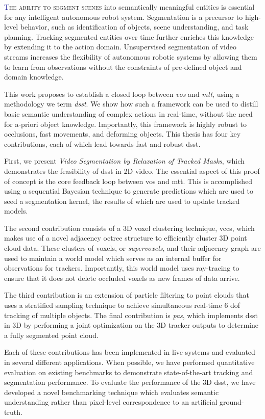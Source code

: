 \lettrine[lines=2, loversize=0.3]{\textcolor{DarkBlue}T}{he ability to segment scenes} into semantically meaningful entities is essential for any intelligent autonomous robot system. Segmentation is a precursor to high-level behavior, such as identification of objects, scene understanding, and task planning. Tracking segmented entities over time further enriches this knowledge by extending it to the action domain. Unsupervised segmentation of video streams increases the flexibility of autonomous robotic systems by allowing them to learn from observations without the constraints of pre-defined object and domain knowledge.

This work proposes to establish a closed loop between \emph{\gls{vos}} and \emph{\gls{mtt}}, using a methodology we term \emph{\gls{dsst}}. We show how such a framework can be used to distill basic semantic understanding of complex actions in real-time, without the need for a-priori object knowledge. Importantly, this framework is highly robust to occlusions, fast movements, and deforming objects. This thesis has four key contributions, each of which lead towards fast and robust \gls{dsst}.

First, we present \emph{Video Segmentation by Relaxation of Tracked Masks}, which demonstrates the feasibility of \gls{dsst} in 2D video. The essential aspect of this proof of concept is the core feedback loop between \gls{vos} and \gls{mtt}. This is accomplished using a sequential Bayesian technique to generate predictions which are used to seed a segmentation kernel, the results of which are used to update tracked models. 

The second contribution consists of a 3D voxel clustering technique, \gls{vccs}, which makes use of a novel adjacency octree structure to efficiently cluster 3D point cloud data. These clusters of voxels, or \emph{supervoxels}, and their adjacency graph are used to maintain a world model which serves as an internal buffer for observations for trackers. Importantly, this world model uses ray-tracing to ensure that it does not delete occluded voxels as new frames of data arrive.

The third contribution is an extension of particle filtering to point clouds that uses a stratified sampling technique to achieve simultaneous real-time 6 \gls{dof} tracking of multiple objects. The final contribution is \emph{\gls{pas}}, which implements \gls{dsst} in 3D by performing a joint optimization on the 3D tracker outputs to determine a fully segmented point cloud. 

Each of these contributions has been implemented in live systems and evaluated in several different applications. When possible, we have performed quantitative evaluation on existing benchmarks to demonstrate state-of-the-art tracking and segmentation performance. To evaluate the performance of the 3D \gls{dsst}, we have developed a novel benchmarking technique which evaluates semantic understanding rather than pixel-level correspondence to an artificial ground-truth.

